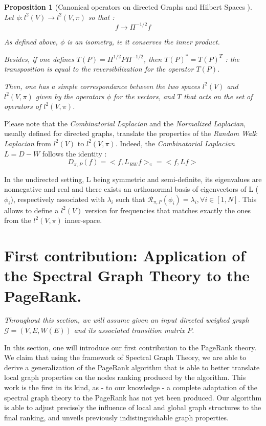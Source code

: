 \documentclass[sn-mathphys]{sn-jnl}%
\theoremstyle{thmstyleone}%
\newtheorem{prop}[theo]{Proposition}
\theoremstyle{thmstyletwo}%
\theoremstyle{thmstylethree}%
\begin{document}
\begin{prop}[Canonical operators on directed Graphs and Hilbert Spaces \cite{sevi2019}]

Let $\phi: l^2(V) \rightarrow  l^2(V, \pi) $ so that :
\begin{equation}
    f \rightarrow \Pi^{-1/2}f
\end{equation}  

As defined above, $\phi$ is an isometry, ie it conserves the inner
product.

Besides, if one defines $T(P) = \Pi^{1/2} P \Pi^{-1/2}$, then
$ T(P)^* = T(P)^T$ : the transposition is equal to the
reversibilization for the operator $T(P)$.

Then, one has a simple correspondance between the two spaces $l^2(V)$
and $l^2(V, \pi)$ given by the operators $\phi$ for the vectors, and
$T$ that acts on the set of operators of $l^2(V, \pi)$.

\end{prop}

Please note that the \textit{Combinatorial Laplacian} and the
\textit{Normalized Laplacian}, usually defined for directed graphs,
translate the properties of the \textit{Random Walk Laplacian} from
$l^2(V)$ to $l^2(V, \pi)$. Indeed, the \textit{Combinatorial
  Laplacian} $L = D-W$ follows the identity :
\begin{equation}
    D_{\pi, P}(f) = <f, L_{RW} f>_\pi = <f,Lf>
\end{equation}

In the undirected setting, L being symmetric and semi-definite, its
eigenvalues are nonnegative and real and there exists an orthonormal
basis of eigenvectors of L ($\phi_i$), respectively associated with
$\lambda_i$ such that
$\mathcal{R}_{\pi,P}(\phi_i) = \lambda_i, \forall i \in [1,N]$. This
allows to define a $l^2(V)$ version for frequencies that matches
exactly the ones from the $l^2(V, \pi)$ inner-space.


\section{First contribution: Application of the Spectral Graph Theory to the PageRank.}\label{sec:SGTapplicationToPR}

\textit{Throughout this section, we will assume given an input
  directed weighed graph $\mathcal{G}=(V,E,W(E))$ and its associated
  transition matrix $P$.}

In this section, one will introduce our first contribution to the
PageRank theory. We claim that using the framework of Spectral Graph
Theory, we are able to derive a generalization of the PageRank
algorithm that is able to better translate local graph properties on
the nodes ranking produced by the algorithm. This work is the first in
its kind, as - to our knowledge - a complete adaptation of the
spectral graph theory to the PageRank has not yet been produced. Our
algorithm is able to adjust precisely the influence of local and
global graph structures to the final ranking, and unveils previously
indistinguishable graph properties.
\end{document}
